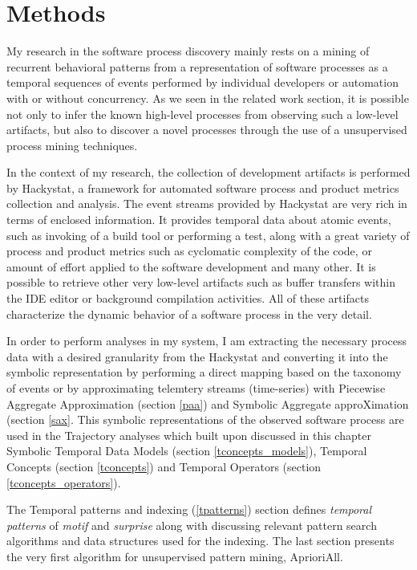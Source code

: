\chapter{Methods} \label{methods}
My research in the software process discovery mainly rests on a mining of recurrent behavioral patterns from a representation of software processes as a temporal sequences of events performed by individual developers or automation with or without concurrency. As we seen in the related work section, it is possible not only to infer the known high-level processes from observing such a low-level artifacts, but also to discover a novel processes through the use of a unsupervised process mining techniques.

In the context of my research, the collection of development artifacts is performed by Hackystat, a framework for automated software process and product metrics collection and analysis. The event streams provided by Hackystat are very rich in terms of enclosed information. It provides temporal data about atomic events, such as invoking of a build tool or performing a test, along with a great variety of process and product metrics such as cyclomatic complexity of the code, or amount of effort applied to the software development and many other. It is possible to retrieve other very low-level artifacts such as buffer transfers within the IDE editor or background compilation activities. All of these artifacts characterize the dynamic behavior of a software process in the very detail.

In order to perform analyses in my system, I am extracting the necessary process data with a desired granularity from the Hackystat and converting it into the symbolic representation by performing a direct mapping based on the taxonomy of events or by approximating telemtery streams (time-series) with Piecewise Aggregate Approximation (section \ref{paa}) and Symbolic Aggregate approXimation (section \ref{sax}. This symbolic representations of the observed software process are used in the Trajectory analyses which built upon discussed in this chapter Symbolic Temporal Data Models (section \ref{tconcepts_models}), Temporal Concepts (section \ref{tconcepts}) and Temporal Operators (section \ref{tconcepts_operators}). 

The Temporal patterns and indexing (\ref{tpatterns}) section defines \textit{temporal patterns} of \textit{motif} and \textit{surprise} along with discussing relevant pattern search algorithms and data structures used for the indexing. The last section presents the very first algorithm for unsupervised pattern mining, AprioriAll.